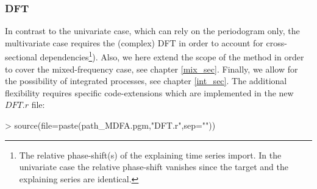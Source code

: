 \documentclass[a4paper]{book}
\begin{document}
\subsubsection{DFT}

In contrast to the univariate case, which can rely on the periodogram only, the multivariate case requires the (complex) DFT in order to account for cross-sectional dependencies\footnote{The relative phase-shift(s) of the explaining time series import. In the univariate case the relative phase-shift vanishes since the target and the explaining series are identical.}). Also, we here extend the scope of the method in order to cover the mixed-frequency case, see chapter \ref{mix_sec}. Finally, we allow for the possibility of integrated processes, see chapter \ref{int_sec}. The additional flexibility requires specific code-extensions which are implemented in the new $DFT.r$ file:


\begin{Schunk}
\begin{Sinput}
> source(file=paste(path_MDFA.pgm,"DFT.r",sep=""))
\end{Sinput}
\end{Schunk}
\end{document}
